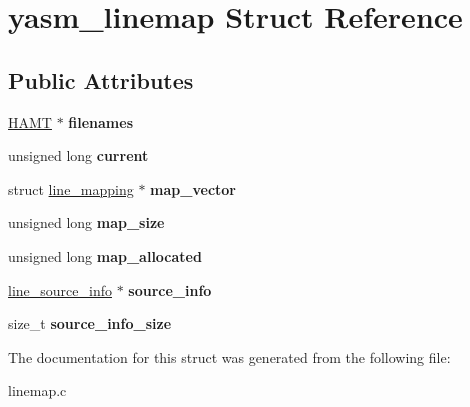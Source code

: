 \hypertarget{structyasm__linemap}{\section{yasm\-\_\-linemap Struct Reference}
\label{structyasm__linemap}
}
\subsection*{Public Attributes}
\begin{DoxyCompactItemize}
\item 
\hypertarget{structyasm__linemap_a0203c72673c33dfa6bdfd94a03cea6d9}{\hyperlink{struct_h_a_m_t}{H\-A\-M\-T} $\ast$ {\bfseries filenames}}\label{structyasm__linemap_a0203c72673c33dfa6bdfd94a03cea6d9}

\item 
\hypertarget{structyasm__linemap_aae6bfb94fde5515cc0f45e50b76ae9fb}{unsigned long {\bfseries current}}\label{structyasm__linemap_aae6bfb94fde5515cc0f45e50b76ae9fb}

\item 
\hypertarget{structyasm__linemap_aa1a9a294fcf66f63212de714fc051baf}{struct \hyperlink{structline__mapping}{line\-\_\-mapping} $\ast$ {\bfseries map\-\_\-vector}}\label{structyasm__linemap_aa1a9a294fcf66f63212de714fc051baf}

\item 
\hypertarget{structyasm__linemap_a7260670ecfef196bcadf49e87c5c481e}{unsigned long {\bfseries map\-\_\-size}}\label{structyasm__linemap_a7260670ecfef196bcadf49e87c5c481e}

\item 
\hypertarget{structyasm__linemap_a0758ebc710bccb6d73c93e709836cdd8}{unsigned long {\bfseries map\-\_\-allocated}}\label{structyasm__linemap_a0758ebc710bccb6d73c93e709836cdd8}

\item 
\hypertarget{structyasm__linemap_a02393dcc46ad5438e8290d20de0d9fa5}{\hyperlink{structline__source__info}{line\-\_\-source\-\_\-info} $\ast$ {\bfseries source\-\_\-info}}\label{structyasm__linemap_a02393dcc46ad5438e8290d20de0d9fa5}

\item 
\hypertarget{structyasm__linemap_a7030ac522c270893f871f334db95c927}{size\-\_\-t {\bfseries source\-\_\-info\-\_\-size}}\label{structyasm__linemap_a7030ac522c270893f871f334db95c927}

\end{DoxyCompactItemize}


The documentation for this struct was generated from the following file\-:\begin{DoxyCompactItemize}
\item 
linemap.\-c\end{DoxyCompactItemize}
